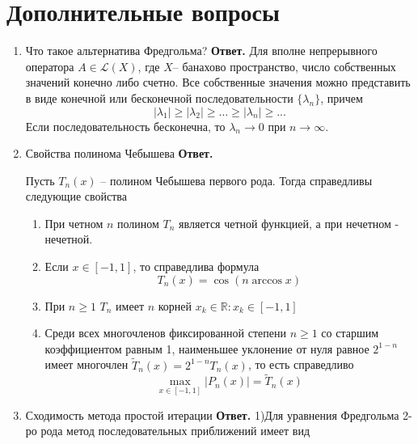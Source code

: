 \documentclass{article}
\begin{document}
	\section{Дополнительные вопросы}
	\begin{enumerate}
		\item Что такое альтернатива Фредгольма?
		\newline 
		{\bfseries Ответ. } 
		Для вполне непрерывного оператора $A \in \mathcal{L}(X)$, 
		где $X $-- банахово пространство, число собственных значений
		конечно либо счетно. Все собственные значения можно представить
		в виде конечной или бесконечной последовательности $\{ \lambda_n\}$,
		причем 
		\begin{equation*}
			|\lambda_1| \geqslant |\lambda_2| \geqslant \ldots \geqslant
			|\lambda_n| \geqslant ... 
		\end{equation*}
		Если последовательность бесконечна, то $\lambda_n \to 0  \text{ при } n \to \infty$.

		\item Свойства полинома Чебышева
				\newline 
		{\bfseries Ответ. } 

		Пусть $T_n(x)$ -- полином Чебышева первого рода. 
		Тогда справедливы следующие свойства
		\begin{enumerate}
			\item При четном $n$ полином $T_n$ является четной 
			функцией, а при нечетном - нечетной.
			\item Если $x \in [-1,1]$, то справедлива формула 
			\begin{equation*}
				T_n(x) = \cos (n \arccos x)
			\end{equation*}
			\item При $n \geqslant 1$ $T_n$ имеет $n$ корней 
			$x_k \in \mathbb{R}: x_k \in[-1,1] $ 
			\item Среди всех многочленов фиксированной степени $n \geqslant 1$
			 со старшим коэффициентом равным 1, наименьшее уклонение от 
			 нуля равное $2^{1-n}$ имеет 
			 многочлен $\tilde{T}_n(x) = 2^{1-n}T_n(x)$,
			 то есть справедливо 
			 \begin{equation*}
				\max\limits_{x \in [-1, 1]} |P_n(x)| = \tilde{T}_n(x)
			 \end{equation*}
		\end{enumerate}
		\item Сходимость метода простой итерации
				\newline 
		{\bfseries Ответ. } 
		1)Для уравнения Фредгольма 2-ро рода метод последовательных приближений имеет вид 
	

\end{enumerate}
\end{document}
